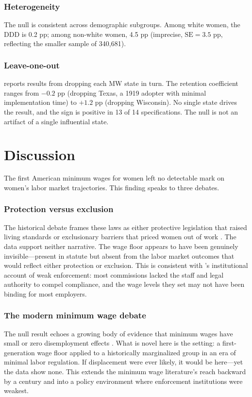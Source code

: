 \documentclass[12pt]{article}
\begin{document}
\subsubsection*{Heterogeneity} The null is consistent across demographic subgroups. Among white women, the DDD is 0.2 pp; among non-white women, 4.5 pp (imprecise, $\text{SE} = 3.5$ pp, reflecting the smaller sample of 340,681).



\subsubsection*{Leave-one-out}  reports results from dropping each MW state in turn. The retention coefficient ranges from $-0.2$ pp (dropping Texas, a 1919 adopter with minimal implementation time) to $+1.2$ pp (dropping Wisconsin). No single state drives the result, and the sign is positive in 13 of 14 specifications. The null is not an artifact of a single influential state.



\section{Discussion}
\label{sec:discussion}

The first American minimum wages for women left no detectable mark on women's labor market trajectories. This finding speaks to three debates.

\subsubsection*{Protection versus exclusion} The historical debate frames these laws as either protective legislation that raised living standards or exclusionary barriers that priced women out of work \citep{seltzer2020, goldin1990understanding}. The data support neither narrative. The wage floor appears to have been genuinely invisible---present in statute but absent from the labor market outcomes that would reflect either protection or exclusion. This is consistent with \citet{seltzer2020}'s institutional account of weak enforcement: most commissions lacked the staff and legal authority to compel compliance, and the wage levels they set may not have been binding for most employers.

\subsubsection*{The modern minimum wage debate} The null result echoes a growing body of evidence that minimum wages have small or zero disemployment effects \citep{card1994minimum, cengiz2019effect, dube2019minimum, harasztosi2019pays}. What is novel here is the setting: a first-generation wage floor applied to a historically marginalized group in an era of minimal labor regulation. If displacement were ever likely, it would be here---yet the data show none. This extends the minimum wage literature's reach backward by a century and into a policy environment where enforcement institutions were weakest.
\end{document}
